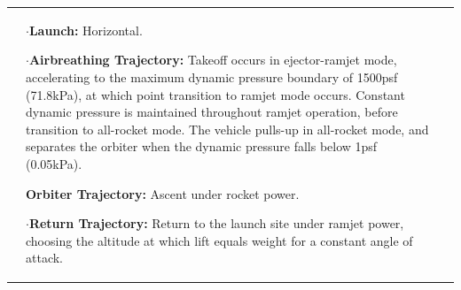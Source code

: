 {\begin{landscape}
\begin{xltabular}{\linewidth}{|X|X|X|}
	&\small
	
	
	$\cdot$\textbf{Launch:} Horizontal.
	
	$\cdot$\textbf{Airbreathing Trajectory:} Takeoff occurs in ejector-ramjet mode, accelerating to the maximum dynamic pressure boundary of 1500psf (71.8kPa), at which point transition to ramjet mode occurs. Constant dynamic pressure is maintained throughout ramjet operation, before transition to all-rocket mode. The vehicle pulls-up in all-rocket mode, and separates the orbiter when the dynamic pressure falls below 1psf (0.05kPa).
	
	\textbf{Orbiter Trajectory:}  Ascent under rocket power.
	
	$\cdot$\textbf{Return Trajectory:} Return to the launch site under ramjet power, choosing the altitude at which lift equals weight for a constant angle of attack. 
	

\end{xltabular}
\end{landscape}}
